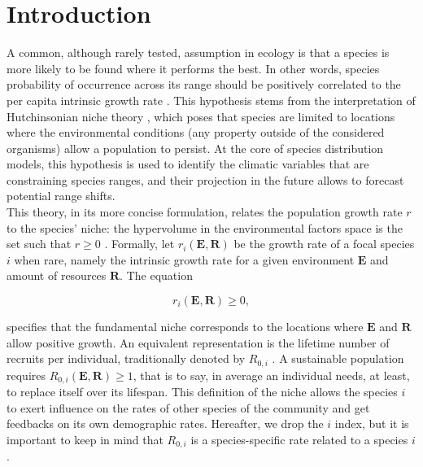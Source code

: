 

\section{Introduction}

A common, although rarely tested, assumption in ecology is that a species is
more likely to be found where it performs the best. In other words, species
probability of occurrence across its range should be positively correlated to
the per capita intrinsic growth rate \citep{McGill2012}. This hypothesis stems
from the interpretation of Hutchinsonian niche theory \citep{Hutchinson1957, Maguire1973}, which poses that species are limited
to locations where the environmental conditions (\ie any property outside of
the considered organisms) allow a population to persist. At the core of
species distribution models, this hypothesis is used to identify the climatic
variables that are constraining species ranges, and their projection in the
future allows to forecast potential range shifts. \\

This theory, in its more concise formulation, relates the population growth
rate $ r $ to the species' niche: the hypervolume in the environmental factors
space is the set such that $ r \geqslant 0 $ \citep{Holt2009, Godsoe2017}.
Formally, let $ r_i(\bm{E}, \bm{R}) $ be the growth rate of a focal species $
i $ when rare, namely the intrinsic growth rate for a given environment $
\bm{E} $ and amount of resources $ \bm{R} $. The equation

\[
	r_i(\bm{E}, \bm{R}) \geqslant 0,
\]

\noindent specifies that the fundamental niche corresponds to the locations
where $ \bm{E} $ and $ \bm{R} $ allow positive growth. An equivalent
representation is the lifetime number of recruits per individual,
traditionally denoted by $ R_{0, i} $ \citep[where $ i $ is still the species index]{Pulliam2000, DeRoos1997}. A sustainable population requires $ R_{0, i}
(\bm{E}, \bm{R}) \geqslant 1 $, that is to say, in average an individual needs, at
least, to replace itself over its lifespan. This definition of the niche
allows the species $ i $ to exert influence on the rates of other species of
the community and get feedbacks on its own demographic rates. Hereafter, we drop the $ i
$ index, but it is important to keep in mind that $ R_{0, i} $ is a species-specific rate related to a species $ i $. \\

